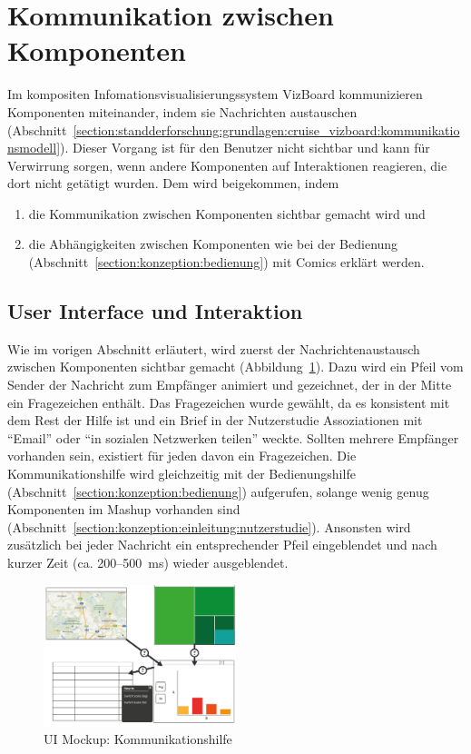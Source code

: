 \documentclass[
	headsepline,
	footsepline,
	fontsize=12pt,
	bibliography=totoc
]{scrbook}
\begin{document}
\section{Kommunikation zwischen Komponenten}
\label{section:konzeption:kommunikation}

Im kompositen Infomationsvisualisierungssystem VizBoard kommunizieren Komponenten miteinander, indem sie Nachrichten austauschen (Abschnitt~\ref{section:standderforschung:grundlagen:cruise_vizboard:kommunikationsmodell}). Dieser Vorgang ist für den Benutzer nicht sichtbar und kann für Verwirrung sorgen, wenn andere Komponenten auf Interaktionen reagieren, die dort nicht getätigt wurden. Dem wird beigekommen, indem 

\begin{enumerate}
	\item die Kommunikation zwischen Komponenten sichtbar gemacht wird und
	\item die Abhängigkeiten zwischen Komponenten wie bei der Bedienung (Abschnitt~\ref{section:konzeption:bedienung}) mit Comics erklärt werden.
\end{enumerate}

\subsection{User Interface und Interaktion}
\label{section:konzeption:kommunikation:ui}

Wie im vorigen Abschnitt erläutert, wird zuerst der Nachrichtenaustausch zwischen Komponenten sichtbar gemacht (Abbildung~\ref{figure:kommunikation-step1}). Dazu wird ein Pfeil vom Sender der Nachricht zum Empfänger animiert und gezeichnet, der in der Mitte ein Fragezeichen enthält. Das Fragezeichen wurde gewählt, da es konsistent mit dem Rest der Hilfe ist und ein Brief in der Nutzerstudie Assoziationen mit \enquote{Email} oder \enquote{in sozialen Netzwerken teilen} weckte. Sollten mehrere Empfänger vorhanden sein, existiert für jeden davon ein Fragezeichen. Die Kommunikationshilfe wird gleichzeitig mit der Bedienungshilfe (Abschnitt~\ref{section:konzeption:bedienung}) aufgerufen, solange wenig genug Komponenten im Mashup vorhanden sind (Abschnitt~\ref{section:konzeption:einleitung:nutzerstudie}). Ansonsten wird zusätzlich bei jeder Nachricht ein entsprechender Pfeil eingeblendet und nach kurzer Zeit (ca. 200--500~ms) wieder ausgeblendet.

\begin{figure}[htbp]
   \centering
   \includegraphics[width=0.5\textwidth]{images/konzeption-kommunikation-step1.png}
   \caption{UI Mockup: Kommunikationshilfe}
   \label{figure:kommunikation-step1}
\end{figure}
\end{document}
